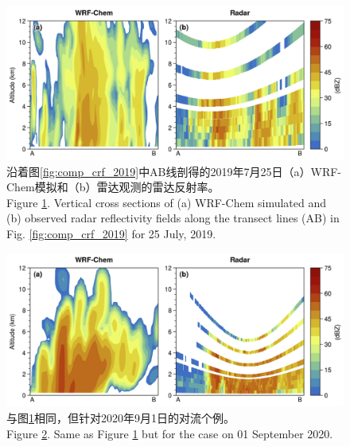 \begin{figure}[H]
\centering
\includegraphics[width=\textwidth]{./figures/comp_dbzcross_2019.png}
\caption{沿着图\ref{fig:comp_crf_2019}中AB线剖得的2019年7月25日（a）WRF-Chem模拟和（b）雷达观测的雷达反射率。\\
Figure \ref{fig:comp_dbzcross_2019}. Vertical cross sections of (a) WRF-Chem simulated and (b) observed radar reflectivity fields along the transect lines (AB) in Fig. \ref{fig:comp_crf_2019} for 25 July, 2019.}
\label{fig:comp_dbzcross_2019}
\end{figure}

\begin{figure}[H]
\centering
\includegraphics[width=\textwidth]{./figures/comp_dbzcross_2020.png}
\caption{与图\ref{fig:comp_dbzcross_2019}相同，但针对2020年9月1日的对流个例。\\
Figure \ref{fig:comp_dbzcross_2020}. Same as Figure \ref{fig:comp_dbzcross_2019} but for the case on 01 September 2020.}
\label{fig:comp_dbzcross_2020}
\end{figure}



